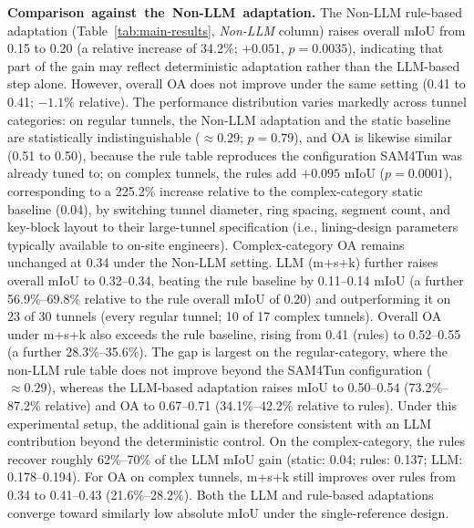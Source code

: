\documentclass[a4paper,fleqn]{cas-dc}
\begin{document}
{\mbox{\textbf{Comparison against the Non-LLM adaptation.}} The Non-LLM rule-based adaptation (Table~\mbox{\ref{tab:main-results}}, \mbox{\emph{Non-LLM}} column) raises overall mIoU from 0.15 to 0.20 (a relative increase of 34.2\%; $+0.051$, $p = 0.0035$), indicating that part of the gain may reflect deterministic adaptation rather than the LLM-based step alone. However, overall OA does not improve under the same setting (0.41 to 0.41; $-1.1\%$ relative). The performance distribution varies markedly across tunnel categories: on regular tunnels, the Non-LLM adaptation and the static baseline are statistically indistinguishable ($\approx 0.29$; $p = 0.79$), and OA is likewise similar (0.51 to 0.50), because the rule table reproduces the configuration SAM4Tun was already tuned to; on complex tunnels, the rules add $+0.095$ mIoU ($p = 0.0001$), corresponding to a 225.2\% increase relative to the complex-category static baseline (0.04), by switching tunnel diameter, ring spacing, segment count, and key-block layout to their large-tunnel specification (i.e., lining-design parameters typically available to on-site engineers). Complex-category OA remains unchanged at 0.34 under the Non-LLM setting. LLM (m+s+k) further raises overall mIoU to 0.32--0.34, beating the rule baseline by 0.11--0.14 mIoU (a further 56.9\%--69.8\% relative to the rule overall mIoU of 0.20) and outperforming it on 23 of 30 tunnels (every regular tunnel; 10 of 17 complex tunnels). Overall OA under m+s+k also exceeds the rule baseline, rising from 0.41 (rules) to 0.52--0.55 (a further 28.3\%--35.6\%). The gap is largest on the regular-category, where the non-LLM rule table does not improve beyond the SAM4Tun configuration ($\approx 0.29$), whereas the LLM-based adaptation raises mIoU to 0.50--0.54 (73.2\%--87.2\% relative) and OA to 0.67--0.71 (34.1\%--42.2\% relative to rules). Under this experimental setup, the additional gain is therefore consistent with an LLM contribution beyond the deterministic control. On the complex-category, the rules recover roughly 62\%--70\% of the LLM mIoU gain (static: 0.04; rules: 0.137; LLM: 0.178--0.194). For OA on complex tunnels, m+s+k still improves over rules from 0.34 to 0.41--0.43 (21.6\%--28.2\%). Both the LLM and rule-based adaptations converge toward similarly low absolute mIoU under the single-reference design.

}
\end{document}
